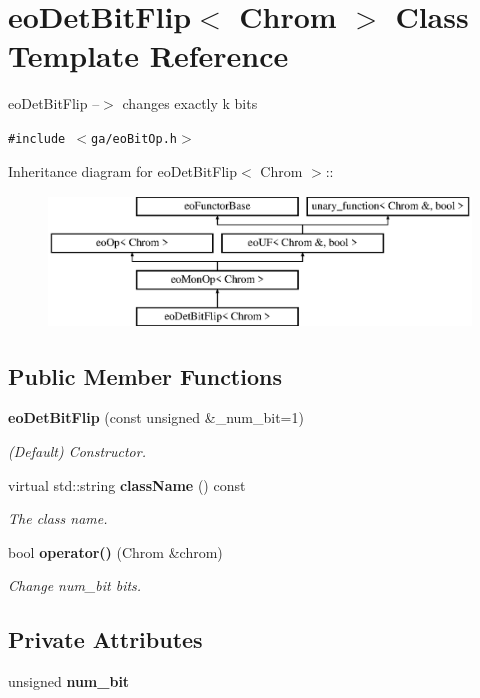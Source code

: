 \section{eo\-Det\-Bit\-Flip$<$ Chrom $>$ Class Template Reference}
\label{classeo_det_bit_flip}
eo\-Det\-Bit\-Flip --$>$ changes exactly k bits  


{\tt \#include $<$ga/eo\-Bit\-Op.h$>$}

Inheritance diagram for eo\-Det\-Bit\-Flip$<$ Chrom $>$::\begin{figure}[H]
\begin{center}
\leavevmode
\includegraphics[height=3.50548cm]{classeo_det_bit_flip}
\end{center}
\end{figure}
\subsection*{Public Member Functions}
\begin{CompactItemize}
\item 
{\bf eo\-Det\-Bit\-Flip} (const unsigned \&\_\-num\_\-bit=1)
\begin{CompactList}\small\item\em (Default) Constructor. \item\end{CompactList}\item 
virtual std::string {\bf class\-Name} () const \label{classeo_det_bit_flip_a1}

\begin{CompactList}\small\item\em The class name. \item\end{CompactList}\item 
bool {\bf operator()} (Chrom \&chrom)
\begin{CompactList}\small\item\em Change num\_\-bit bits. \item\end{CompactList}\end{CompactItemize}
\subsection*{Private Attributes}
\begin{CompactItemize}
\item 
unsigned {\bf num\_\-bit}\label{classeo_det_bit_flip_r0}

\end{CompactItemize}


